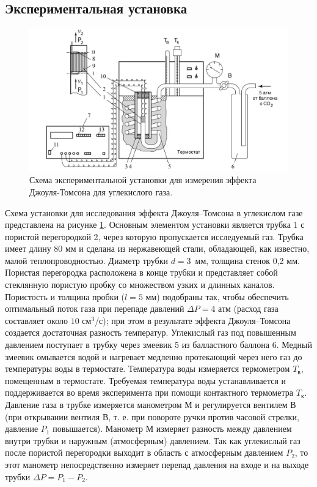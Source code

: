 \documentclass[12pt]{article}
\begin{document}
\subsection*{Экспериментальная установка}
\begin{figure}[H]
    \centering
    \includegraphics[width=0.7\linewidth]{ustj.jpg}
    \caption{Схема экспериментальной установки для измерения эффекта Джоуля-Томсона для углекислого газа.}
    \label{ust}
\end{figure}
Схема установки для исследования эффекта Джоуля–Томсона в углекислом газе представлена на рисунке \ref{ust}. Основным элементом установки является трубка 1 с пористой перегородкой 2, через которую пропускается исследуемый газ. Трубка имеет длину 80 мм и сделана из нержавеющей стали, обладающей, как известно, малой теплопроводностью. Диаметр трубки $ d = 3 $~мм, толщина стенок 0,2 мм. Пористая перегородка расположена в конце трубки и представляет собой стеклянную пористую пробку со множеством узких и длинных каналов. Пористость и толщина пробки ($ l = 5 $ мм) подобраны так, чтобы обеспечить оптимальный поток газа при перепаде давлений $ \Delta P = 4 $ атм (расход газа составляет около $ 10 $ см$ ^3 $/с); при этом в результате эффекта Джоуля–Томсона создается достаточная разность температур.
Углекислый газ под повышенным давлением поступает в трубку через змеевик 5 из балластного баллона 6. Медный змеевик омывается водой и нагревает медленно протекающий через него газ до температуры воды в термостате. Температура воды измеряется термометром $ T_\text{в} $, помещенным в термостате. Требуемая температура воды устанавливается и поддерживается во время эксперимента при помощи контактного термометра $ T_\text{к} $.
Давление газа в трубке измеряется манометром М и регулируется вентилем В (при открывании вентиля В, т. е. при повороте ручки против часовой стрелки, давление $ P_1 $ повышается). Манометр М измеряет разность между давлением внутри трубки и наружным (атмосферным) давлением. Так как углекислый газ после пористой перегородки выходит в область с атмосферным давлением $ P_2 $, то этот манометр непосредственно измеряет перепад давления на входе и на выходе трубки $ \Delta P = P_1 - P_2 $.
\end{document}
